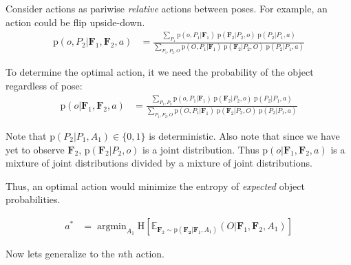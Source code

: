 \documentclass[11pt]{article}
\newcommand{\ProbOpr}[1]{\mathbb{#1}} %
\newcommand{\SetOf}[1]{\mathbf{#1}} %
\newcommand{\prob}[1]{\text{p}(#1)} %
\newcommand{\entropy}[1]{\text{H}\left[#1\right]} %
\newcommand{\expectedValue}[2]{\ProbOpr{E}_{#2}\left(#1\right)} %
\DeclareMathOperator*{\argmin}{argmin}
\newcommand{\Eq}[1]{\begin{align*}#1\end{align*}} %
\newcommand{\italic}[1]{\textit{#1}} %
\begin{document}
	Consider actions as pariwise \italic{relative} actions between poses. For example, an action could be flip upside-down. 
	\Eq{\prob{o,P_2|\SetOf{F}_1,\SetOf{F}_2,a} &= \frac{\sum_{P_1} \prob{o,P_1|\SetOf{F}_1} \; \prob{\SetOf{F}_2|P_2,o} \; \prob{P_2|P_1,a}}{\sum_{P_1,P_2,O} \prob{O,P_1|\SetOf{F}_1} \; \prob{\SetOf{F}_2|P_2,O} \; \prob{P_2|P_1,a}}}

	To determine the optimal action, it we need the probability of the object regardless of pose:
	\Eq{\prob{o|\SetOf{F}_1,\SetOf{F}_2,a} &= \frac{\sum_{P_1,P_2} \prob{o,P_1|\SetOf{F}_1} \; \prob{\SetOf{F}_2|P_2,o} \; \prob{P_2|P_1,a}}{\sum_{P_1,P_2,O} \prob{O,P_1|\SetOf{F}_1} \; \prob{\SetOf{F}_2|P_2,O} \; \prob{P_2|P_1,a}}}

	Note that $\prob{P_2|P_1,A_1} \in \{0,1\}$ is deterministic. Also note that since we have yet to observe $\SetOf{F}_2$, $\prob{\SetOf{F}_2|P_2,o}$ is a joint distribution. Thus $\prob{o|\SetOf{F}_1,\SetOf{F}_2,a}$ is a mixture of joint distributions divided by a mixture of joint distributions.

	Thus, an optimal action would minimize the entropy of \italic{expected} object probabilities.

	\Eq{a^* &= \argmin_{A_1} \entropy{\expectedValue{O|\SetOf{F}_1,\SetOf{F}_2,A_1}{\SetOf{F}_2 \sim \prob{\SetOf{F_2}|\SetOf{F}_1,A_1}}}}

	Now lets generalize to the $n$th action.
	
	\begin{center}
	\end{center}
\end{document}
